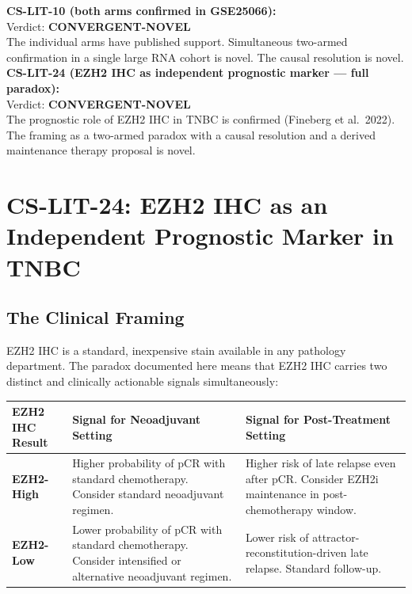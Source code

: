 \documentclass[12pt, a4paper]{article}
\begin{document}
\begin{center}
\colorbox{findingbox}{
\begin{minipage}{0.82\textwidth}
\vspace{0.4em}
\textbf{CS-LIT-10 (both arms confirmed in GSE25066):}\\
Verdict: \textbf{CONVERGENT-NOVEL}\\
The individual arms have published support.
Simultaneous two-armed confirmation in a single
large RNA cohort is novel. The causal resolution
is novel.\\[0.5em]
\textbf{CS-LIT-24 (EZH2 IHC as independent
prognostic marker --- full paradox):}\\
Verdict: \textbf{CONVERGENT-NOVEL}\\
The prognostic role of EZH2 IHC in TNBC is
confirmed (Fineberg et al.\ 2022). The framing
as a two-armed paradox with a causal resolution
and a derived maintenance therapy proposal is novel.
\vspace{0.4em}
\end{minipage}}
\end{center}

\section{CS-LIT-24: EZH2 IHC as an Independent
Prognostic Marker in TNBC}

\subsection{The Clinical Framing}

EZH2 IHC is a standard, inexpensive stain available
in any pathology department. The paradox documented
here means that EZH2 IHC carries two distinct
and clinically actionable signals simultaneously:

\begin{center}
\begin{tabular}{p{4cm}p{5cm}p{5cm}}
\toprule
\textbf{EZH2 IHC Result} &
\textbf{Signal for Neoadjuvant Setting} &
\textbf{Signal for Post-Treatment Setting} \\
\midrule
\textbf{EZH2-High} &
Higher probability of pCR with standard
chemotherapy. Consider standard neoadjuvant
regimen. &
Higher risk of late relapse even after pCR.
Consider EZH2i maintenance in
post-chemotherapy window. \\[0.5em]
\textbf{EZH2-Low} &
Lower probability of pCR with standard
chemotherapy. Consider intensified or alternative
neoadjuvant regimen. &
Lower risk of attractor-reconstitution-driven
late relapse. Standard follow-up. \\
\bottomrule
\end{tabular}
\end{center}
\end{document}
